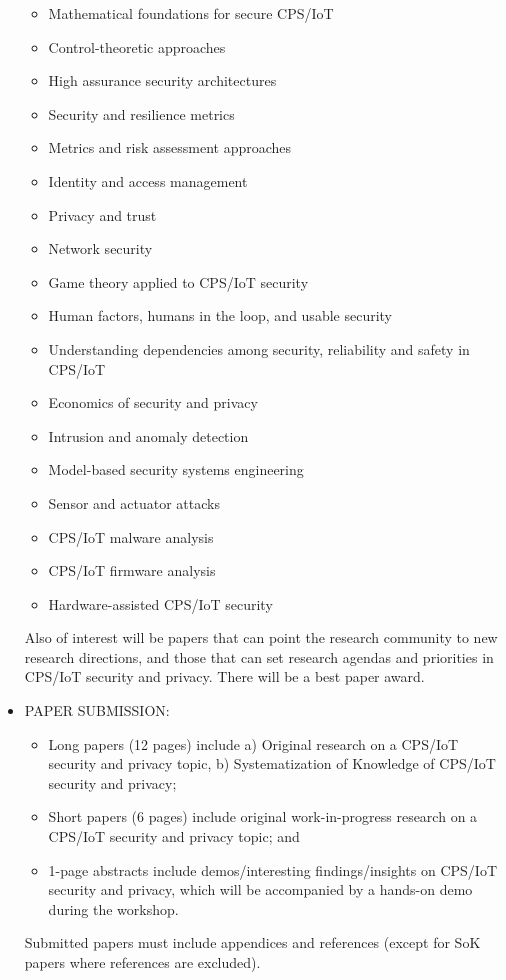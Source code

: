 \documentclass[prodmode,acmtecs]{acmsmall} %
\begin{document}
\begin{itemize}
\begin{itemize}\item  Mathematical foundations for secure CPS/IoT
\item  Control-theoretic approaches
\item  High assurance security architectures
\item  Security and resilience metrics
\item  Metrics and risk assessment approaches
\item  Identity and access management
\item  Privacy and trust
\item  Network security
\item  Game theory applied to CPS/IoT security
\item  Human factors, humans in the loop, and usable security
\item  Understanding dependencies among security, reliability and safety in CPS/IoT
\item  Economics of security and privacy
\item  Intrusion and anomaly detection
\item  Model-based security systems engineering
\item  Sensor and actuator attacks
\item  CPS/IoT malware analysis
\item  CPS/IoT firmware analysis
\item  Hardware-assisted CPS/IoT security
\end{itemize} 
  Also of interest will be papers that can point the research community to new research directions, and those that can set research agendas and priorities in CPS/IoT security and privacy. There will be a best paper award. 
 
\item  PAPER SUBMISSION: 
 
\begin{itemize}\item  Long papers (12 pages) include a) Original research on a CPS/IoT security and privacy topic, b) Systematization of Knowledge of CPS/IoT security and privacy;
\item  Short papers (6 pages) include original work-in-progress research on a CPS/IoT security and privacy topic; and
\item  1-page abstracts include demos/interesting findings/insights on CPS/IoT security and privacy, which will be accompanied by a hands-on demo during the workshop. 
\end{itemize} 
  Submitted papers must include appendices and references (except for SoK papers where references are excluded). 
 

\end{itemize}
\end{document}
